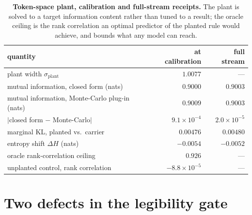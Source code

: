\begin{table}[h]
  \centering
  \small
  \caption{\textbf{Token-space plant, calibration and full-stream receipts.} The plant is solved to
  a target information content rather than tuned to a result; the oracle ceiling is the rank
  correlation an optimal predictor of the planted rule would achieve, and bounds what any model can
  reach.}
  \label{tab:plant}
  \begin{tabular}{@{}lrr@{}}
    \toprule
    quantity & at calibration & full stream \\
    \midrule
    plant width $\sigma_{\text{plant}}$ & $1.0077$ & --- \\
    mutual information, closed form (nats) & $0.9000$ & $0.9003$ \\
    mutual information, Monte-Carlo plug-in (nats) & $0.9009$ & $0.9003$ \\
    $|$closed form $-$ Monte-Carlo$|$ & $9.1\times10^{-4}$ & $2.0\times10^{-5}$ \\
    marginal KL, planted vs.\ carrier & $0.00476$ & $0.00480$ \\
    entropy shift $\Delta H$ (nats) & $-0.0054$ & $-0.0052$ \\
    oracle rank-correlation ceiling & $0.926$ & --- \\
    unplanted control, rank correlation & $-8.8\times10^{-5}$ & --- \\
    \bottomrule
  \end{tabular}
\end{table}

\section{Two defects in the legibility gate}
\label{app:gate-defects}

